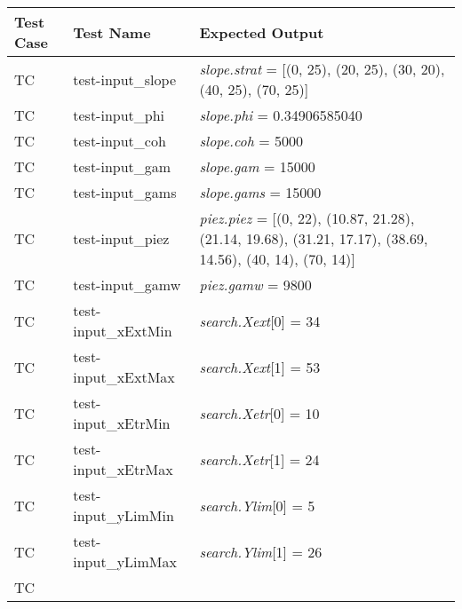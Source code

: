 \documentclass[12pt, titlepage]{article}
\newcounter{utestnum} %
\begin{document}
\begin{longtable}{  l  p{4cm}  p{6cm}  }
	\hline
	\textbf{Test Case} & \textbf{Test Name} & \textbf{Expected Output} \\
	\hline
	TC{utestnum}\theutestnum  \label{TC_InputSlope} & 
	test-input\_slope &  \textit{slope.strat} = [(0, 25), (20, 25), (30, 20), 
	(40, 25), (70, 25)]\\
	\hline 
	TC{utestnum}\theutestnum  \label{TC_InputPhi} & 
	test-input\_phi &  \textit{slope.phi} = 0.34906585040\\ 
	\hline
	TC{utestnum}\theutestnum  \label{TC_InputCoh} & 
	test-input\_coh &  \textit{slope.coh} = 5000\\ 
	\hline
	TC{utestnum}\theutestnum  \label{TC_InputGam} & 
	test-input\_gam &  \textit{slope.gam} = 15000\\ 
	\hline
	TC{utestnum}\theutestnum  \label{TC_InputGams} & 
	test-input\_gams &  \textit{slope.gams} = 15000\\ 
	\hline
	TC{utestnum}\theutestnum  \label{TC_InputWT} & 
	test-input\_piez &  \textit{piez.piez} = [(0, 22), 
	(10.87, 21.28), (21.14, 19.68), (31.21, 17.17), (38.69, 14.56), (40, 
	14), (70, 14)]\\
	\hline 
	TC{utestnum}\theutestnum  \label{TC_InputGamw} & 
	test-input\_gamw &  \textit{piez.gamw} = 9800\\ 
	\hline
	TC{utestnum}\theutestnum  \label{TC_InputXextMin} & 
	test-input\_xExtMin &  \textit{search.Xext}[0] = 34\\ 
	\hline
	TC{utestnum}\theutestnum  \label{TC_InputXextMax} & 
	test-input\_xExtMax &  \textit{search.Xext}[1] = 53\\ 
	\hline
	TC{utestnum}\theutestnum  \label{TC_InputXetrMin} & 
	test-input\_xEtrMin &  \textit{search.Xetr}[0] = 10\\ 
	\hline
	TC{utestnum}\theutestnum  \label{TC_InputXetrMax} & 
	test-input\_xEtrMax &  \textit{search.Xetr}[1] = 24\\ 
	\hline
	TC{utestnum}\theutestnum  \label{TC_InputYlimMin} & 
	test-input\_yLimMin &  \textit{search.Ylim}[0] = 5\\ 
	\hline
	TC{utestnum}\theutestnum  \label{TC_InputYlimMax} & 
	test-input\_yLimMax &  \textit{search.Ylim}[1] = 26\\ 
	\hline
	TC{utestnum}\theutestnum  \label{TC_InputLtoR} & 

\end{longtable}
\end{document}
